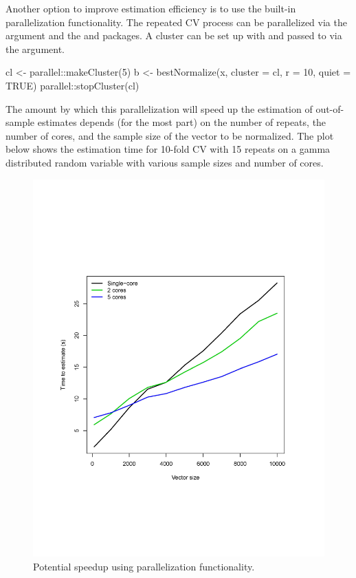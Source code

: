 Another option to improve estimation efficiency is to use the built-in
parallelization functionality. The repeated CV process can be
parallelized via the  argument and the 
and  \citep{doRNG} packages. A cluster can be set up with
 and passed to  via the
 argument.

\begin{Schunk}
\begin{Sinput}
cl <- parallel::makeCluster(5)
b <- bestNormalize(x, cluster = cl, r = 10, quiet = TRUE)
parallel::stopCluster(cl)
\end{Sinput}
\end{Schunk}

The amount by which this parallelization will speed up the estimation of
out-of-sample estimates depends (for the most part) on the number of
repeats, the number of cores, and the sample size of the vector to be
normalized. The plot below shows the estimation time for 10-fold CV with
15 repeats on a gamma distributed random variable with various sample
sizes and number of cores.

\begin{Schunk}
\begin{figure}

{\centering \includegraphics[width=1\linewidth]{figs/parallel_timings} 

}

\caption[Potential speedup using parallelization functionality]{Potential speedup using parallelization functionality.}\label{fig:parallel_timings}
\end{figure}
\end{Schunk}

